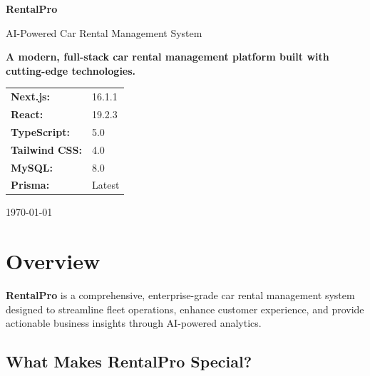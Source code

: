 \documentclass[12pt,a4paper]{article}
\begin{document}
\begin{titlepage}
    \centering
    \vspace*{2cm}

    {\Huge\bfseries RentalPro\par}
    \vspace{0.5cm}
    {\Large AI-Powered Car Rental Management System\par}
    \vspace{2cm}

    \begin{tcolorbox}[colback=blue!5!white,colframe=blue!75!black,width=0.8\textwidth]
        \centering
        \textbf{A modern, full-stack car rental management platform built with cutting-edge technologies.}
    \end{tcolorbox}

    \vspace{2cm}

    \begin{tabular}{ll}
        \textbf{Next.js:} & 16.1.1 \\
        \textbf{React:} & 19.2.3 \\
        \textbf{TypeScript:} & 5.0 \\
        \textbf{Tailwind CSS:} & 4.0 \\
        \textbf{MySQL:} & 8.0 \\
        \textbf{Prisma:} & Latest \\
    \end{tabular}

    \vfill

    {\large \today\par}
\end{titlepage}

\tableofcontents
\newpage

\section{Overview}

\textbf{RentalPro} is a comprehensive, enterprise-grade car rental management system designed to streamline fleet operations, enhance customer experience, and provide actionable business insights through AI-powered analytics.

\subsection{What Makes RentalPro Special?}
\end{document}

